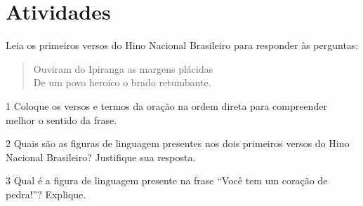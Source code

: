 
\section*{Atividades}

Leia os primeiros versos do Hino Nacional Brasileiro para responder às perguntas:

\begin{verse}
Ouviram do Ipiranga as margens plácidas \\
De um povo heroico o brado retumbante.
\end{verse}


\num{1} Coloque os versos e termos da oração na ordem direta para compreender 
melhor o sentido da frase. 


\num{2} Quais são as figuras de linguagem presentes nos dois primeiros versos do 
Hino Nacional Brasileiro? Justifique sua resposta.


\num{3} Qual é a figura de linguagem presente na frase ``Você tem um coração de pedra!''? 
Explique.


